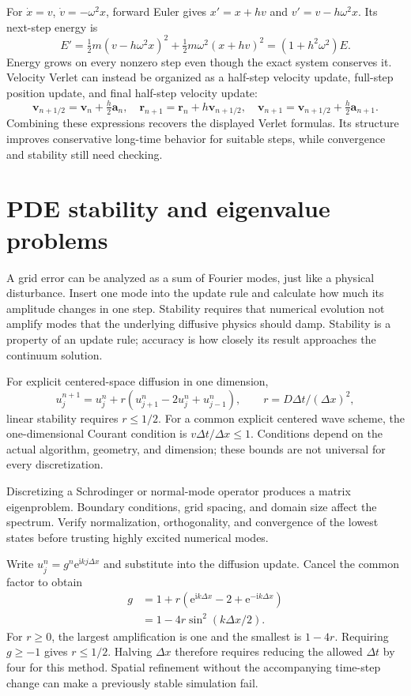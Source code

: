 \documentclass[11pt,oneside]{book}
\newcommand{\ii}{\mathrm{i}}
\newcommand{\ee}{\mathrm{e}}
\newcommand{\vect}[1]{\boldsymbol{#1}}
\theoremstyle{reviewstyle}
\begin{document}
For $\dot x=v$, $\dot v=-\omega^2x$, forward Euler gives $x'=x+hv$ and $v'=v-h\omega^2x$. Its next-step energy is
\begin{equation}
E'=\tfrac12m(v-h\omega^2x)^2+\tfrac12m\omega^2(x+hv)^2
=(1+h^2\omega^2)E.
\end{equation}
Energy grows on every nonzero step even though the exact system conserves it. Velocity Verlet can instead be organized as a half-step velocity update, full-step position update, and final half-step velocity update:
\begin{equation}
\vect v_{n+1/2}=\vect v_n+\tfrac h2\vect a_n,\quad
\vect r_{n+1}=\vect r_n+h\vect v_{n+1/2},\quad
\vect v_{n+1}=\vect v_{n+1/2}+\tfrac h2\vect a_{n+1}.
\end{equation}
Combining these expressions recovers the displayed Verlet formulas. Its structure improves conservative long-time behavior for suitable steps, while convergence and stability still need checking.

\section{PDE stability and eigenvalue problems}
A grid error can be analyzed as a sum of Fourier modes, just like a physical disturbance. Insert one mode into the update rule and calculate how much its amplitude changes in one step. Stability requires that numerical evolution not amplify modes that the underlying diffusive physics should damp. Stability is a property of an update rule; accuracy is how closely its result approaches the continuum solution.

For explicit centered-space diffusion in one dimension,
\begin{equation}u_j^{n+1}=u_j^n+r(u_{j+1}^n-2u_j^n+u_{j-1}^n),\qquad r=D\Delta t/(\Delta x)^2,\end{equation}
linear stability requires $r\leq1/2$. For a common explicit centered wave scheme, the one-dimensional Courant condition is $v\Delta t/\Delta x\leq1$. Conditions depend on the actual algorithm, geometry, and dimension; these bounds are not universal for every discretization.

Discretizing a Schrodinger or normal-mode operator produces a matrix eigenproblem. Boundary conditions, grid spacing, and domain size affect the spectrum. Verify normalization, orthogonality, and convergence of the lowest states before trusting highly excited numerical modes.

Write $u_j^n=g^n\ee^{\ii kj\Delta x}$ and substitute into the diffusion update. Cancel the common factor to obtain
\begin{align}
g&=1+r(\ee^{\ii k\Delta x}-2+\ee^{-\ii k\Delta x})\\
&=1-4r\sin^2(k\Delta x/2).
\end{align}
For $r\geq0$, the largest amplification is one and the smallest is $1-4r$. Requiring $g\geq-1$ gives $r\leq1/2$. Halving $\Delta x$ therefore requires reducing the allowed $\Delta t$ by four for this method. Spatial refinement without the accompanying time-step change can make a previously stable simulation fail.
\end{document}
